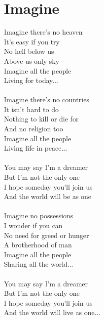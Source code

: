 \section{Imagine}
Imagine there's no heaven\\
It's easy if you try\\
No hell below us\\
Above us only sky\\
Imagine all the people\\
Living for today...\\
\\
Imagine there's no countries\\
It isn't hard to do\\
Nothing to kill or die for\\
And no religion too\\
Imagine all the people\\
Living life in peace...\\
\\
You may say I'm a dreamer\\
But I'm not the only one\\
I hope someday you'll join us\\
And the world will be as one\\
\\
Imagine no possessions\\
I wonder if you can\\
No need for greed or hunger\\
A brotherhood of man\\
Imagine all the people\\
Sharing all the world...\\
\\
You may say I'm a dreamer\\
But I'm not the only one\\
I hope someday you'll join us\\
And the world will live as one...\\
